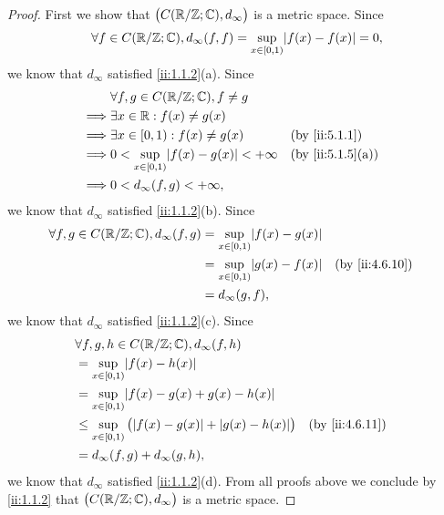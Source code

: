 \begin{proof}
  First we show that \(\big(C(\mathbb{R} / \mathbb{Z} ; \mathbb{C}), d_\infty\big)\) is a metric space.
  Since
  \[
    \forall f \in C(\R / \Z ; \C), d_\infty(f, f) = \sup_{x \in [0, 1)} \abs{f(x) - f(x)} = 0,
  \]
  we know that \(d_\infty\) satisfied \cref{ii:1.1.2}(a).
  Since
  \begin{align*}
             & \forall f, g \in C(\R / \Z ; \C), f \neq g                                \\
    \implies & \exists x \in \R : f(x) \neq g(x)                                         \\
    \implies & \exists x \in [0, 1) : f(x) \neq g(x)               &  & \by{ii:5.1.1}    \\
    \implies & 0 < \sup_{x \in [0, 1)} \abs{f(x) - g(x)} < +\infty &  & \by{ii:5.1.5}[a] \\
    \implies & 0 < d_\infty(f, g) < +\infty,
  \end{align*}
  we know that \(d_\infty\) satisfied \cref{ii:1.1.2}(b).
  Since
  \begin{align*}
    \forall f, g \in C(\R / \Z ; \C), d_\infty(f, g) & = \sup_{x \in [0, 1)} \abs{f(x) - g(x)}                     \\
                                                     & = \sup_{x \in [0, 1)} \abs{g(x) - f(x)} &  & \by{ii:4.6.10} \\
                                                     & = d_\infty(g, f),
  \end{align*}
  we know that \(d_\infty\) satisfied \cref{ii:1.1.2}(c).
  Since
  \begin{align*}
     & \forall f, g, h \in C(\R / \Z ; \C), d_\infty(f, h)                                          \\
     & = \sup_{x \in [0, 1)} \abs{f(x) - h(x)}                                                      \\
     & = \sup_{x \in [0, 1)} \abs{f(x) - g(x) + g(x) - h(x)}                                        \\
     & \leq \sup_{x \in [0, 1)} \big(\abs{f(x) - g(x)} + \abs{g(x) - h(x)}\big) &  & \by{ii:4.6.11} \\
     & = d_\infty(f, g) + d_\infty(g, h),
  \end{align*}
  we know that \(d_\infty\) satisfied \cref{ii:1.1.2}(d).
  From all proofs above we conclude by \cref{ii:1.1.2} that \(\big(C(\mathbb{R} / \mathbb{Z} ; \mathbb{C}), d_\infty\big)\) is a metric space.


\end{proof}
